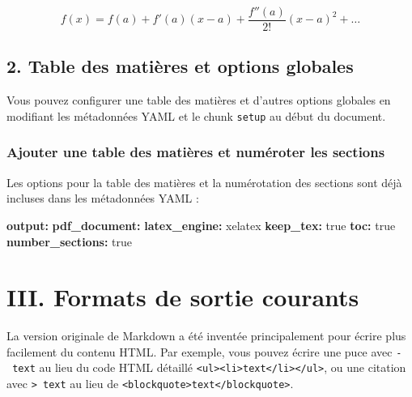 \documentclass[
]{article}
\newenvironment{Shaded}{\begin{snugshade}}{\end{snugshade}}
\newcommand{\AttributeTok}[1]{\textcolor[rgb]{0.13,0.29,0.53}{#1}}
\newcommand{\CharTok}[1]{\textcolor[rgb]{0.31,0.60,0.02}{#1}}
\newcommand{\FunctionTok}[1]{\textcolor[rgb]{0.13,0.29,0.53}{\textbf{#1}}}
\newcommand{\KeywordTok}[1]{\textcolor[rgb]{0.13,0.29,0.53}{\textbf{#1}}}
\begin{document}
\[ f(x) = f(a) + f'(a)(x-a) + \frac{f''(a)}{2!}(x-a)^2 + \dots \]

\hypertarget{table-des-matiuxe8res-et-options-globales}{%
\subsection{2. Table des matières et options
globales}\label{table-des-matiuxe8res-et-options-globales}}

Vous pouvez configurer une table des matières et d'autres options
globales en modifiant les métadonnées YAML et le chunk \texttt{setup} au
début du document.

\hypertarget{ajouter-une-table-des-matiuxe8res-et-numuxe9roter-les-sections}{%
\subsubsection{Ajouter une table des matières et numéroter les
sections}\label{ajouter-une-table-des-matiuxe8res-et-numuxe9roter-les-sections}}

Les options pour la table des matières et la numérotation des sections
sont déjà incluses dans les métadonnées YAML :

\begin{Shaded}
\begin{Highlighting}[]
\FunctionTok{output}\KeywordTok{:}
\AttributeTok{  }\FunctionTok{pdf\_document}\KeywordTok{:}
\AttributeTok{    }\FunctionTok{latex\_engine}\KeywordTok{:}\AttributeTok{ xelatex}
\AttributeTok{    }\FunctionTok{keep\_tex}\KeywordTok{:}\AttributeTok{ }\CharTok{true}
\AttributeTok{    }\FunctionTok{toc}\KeywordTok{:}\AttributeTok{ }\CharTok{true}
\AttributeTok{    }\FunctionTok{number\_sections}\KeywordTok{:}\AttributeTok{ }\CharTok{true}
\end{Highlighting}
\end{Shaded}

\hypertarget{iii.-formats-de-sortie-courants}{%
\section{III. Formats de sortie
courants}\label{iii.-formats-de-sortie-courants}}

La version originale de Markdown a été inventée principalement pour
écrire plus facilement du contenu HTML. Par exemple, vous pouvez écrire
une puce avec \texttt{-\ text} au lieu du code HTML détaillé
\texttt{\textless{}ul\textgreater{}\textless{}li\textgreater{}text\textless{}/li\textgreater{}\textless{}/ul\textgreater{}},
ou une citation avec \texttt{\textgreater{}\ text} au lieu de
\texttt{\textless{}blockquote\textgreater{}text\textless{}/blockquote\textgreater{}}.
\end{document}
